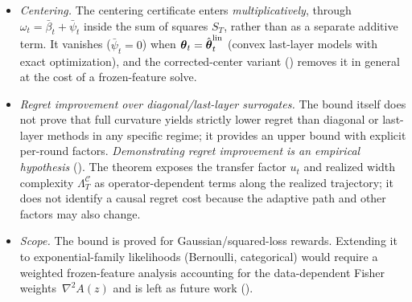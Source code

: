 \documentclass[twoside]{article}
\newcommand{\Calg}{\mathcal{C}}                 %
\newcommand{\Lamalg}{\Lambda^{\Calg}}           %
\begin{document}
\begin{itemize}[nosep,leftmargin=1.5em]
requires $E_T/T\to0$; a nonvanishing uniform per-round error bound alone yields
an $O(T)$ additive term.
\item \emph{Centering.}
The centering certificate enters \emph{multiplicatively}, through
$\omega_t=\bar\beta_t+\bar\psi_t$ inside the sum of squares $S_T$, rather than as
a separate additive term.  It vanishes
($\bar\psi_t=0$) when $\boldsymbol{\theta}_t=\hat{\boldsymbol{\theta}}_t^{\mathrm{lin}}$ (convex
last-layer models with exact optimization), and the corrected-center
variant () removes it in general at the cost of
a frozen-feature solve.
\item \emph{Regret improvement over diagonal/last-layer surrogates.}
The bound itself does not prove that full curvature yields strictly lower
regret than diagonal or last-layer methods in any specific regime; it
provides an upper bound with explicit per-round factors.
\emph{Demonstrating regret improvement is an empirical hypothesis}
().  The theorem exposes the transfer factor $u_t$ and
realized width complexity $\Lamalg_T$ as operator-dependent terms along the
realized trajectory; it does not identify a causal regret cost because the
adaptive path and other factors may also change.
\item \emph{Scope.}
The bound is proved for Gaussian/squared-loss rewards.
Extending it to exponential-family likelihoods (Bernoulli, categorical)
would require a weighted frozen-feature analysis accounting for the
data-dependent Fisher weights~$\nabla^2 A(z)$ and is left as future work
().
\end{itemize}
\end{document}
